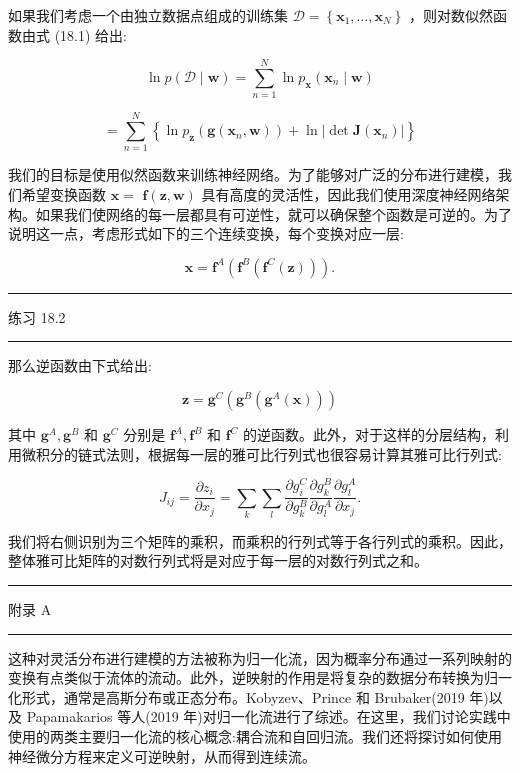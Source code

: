 \documentclass[10pt]{report}
\newcommand{\HRule}{\begin{center}\rule{0.9\linewidth}{0.2mm}\end{center}}
\begin{document}
如果我们考虑一个由独立数据点组成的训练集 \(\mathcal{D} = \left\{  {{\mathbf{x}}_{1},\ldots ,{\mathbf{x}}_{N}}\right\}\) ，则对数似然函数由式 (18.1) 给出:

\[
\ln p\left( {\mathcal{D} \mid  \mathbf{w}}\right)  = \mathop{\sum }\limits_{{n = 1}}^{N}\ln {p}_{\mathbf{x}}\left( {{\mathbf{x}}_{n} \mid  \mathbf{w}}\right)  \tag{18.3}
\]

\[
= \mathop{\sum }\limits_{{n = 1}}^{N}\left\{  {\ln {p}_{\mathbf{z}}\left( {\mathbf{g}\left( {{\mathbf{x}}_{n},\mathbf{w}}\right) }\right)  + \ln \left| {\det \mathbf{J}\left( {\mathbf{x}}_{n}\right) }\right| }\right\}   \tag{18.4}
\]

我们的目标是使用似然函数来训练神经网络。为了能够对广泛的分布进行建模，我们希望变换函数 \(\mathbf{x} =\)  \(\mathbf{f}\left( {\mathbf{z},\mathbf{w}}\right)\) 具有高度的灵活性，因此我们使用深度神经网络架构。如果我们使网络的每一层都具有可逆性，就可以确保整个函数是可逆的。为了说明这一点，考虑形式如下的三个连续变换，每个变换对应一层:

\[
\mathbf{x} = {\mathbf{f}}^{A}\left( {{\mathbf{f}}^{B}\left( {{\mathbf{f}}^{C}\left( \mathbf{z}\right) }\right) }\right) . \tag{18.5}
\]

\HRule

练习 18.2

\HRule

那么逆函数由下式给出:

\[
\mathbf{z} = {\mathbf{g}}^{C}\left( {{\mathbf{g}}^{B}\left( {{\mathbf{g}}^{A}\left( \mathbf{x}\right) }\right) }\right)  \tag{18.6}
\]

其中 \({\mathbf{g}}^{A},{\mathbf{g}}^{B}\) 和 \({\mathbf{g}}^{C}\) 分别是 \({\mathbf{f}}^{A},{\mathbf{f}}^{B}\) 和 \({\mathbf{f}}^{C}\) 的逆函数。此外，对于这样的分层结构，利用微积分的链式法则，根据每一层的雅可比行列式也很容易计算其雅可比行列式:

\[
{J}_{ij} = \frac{\partial {z}_{i}}{\partial {x}_{j}} = \mathop{\sum }\limits_{k}\mathop{\sum }\limits_{l}\frac{\partial {g}_{i}^{C}}{\partial {g}_{k}^{B}}\frac{\partial {g}_{k}^{B}}{\partial {g}_{l}^{A}}\frac{\partial {g}_{l}^{A}}{\partial {x}_{j}}. \tag{18.7}
\]

我们将右侧识别为三个矩阵的乘积，而乘积的行列式等于各行列式的乘积。因此，整体雅可比矩阵的对数行列式将是对应于每一层的对数行列式之和。

\HRule

附录 A

\HRule

这种对灵活分布进行建模的方法被称为归一化流，因为概率分布通过一系列映射的变换有点类似于流体的流动。此外，逆映射的作用是将复杂的数据分布转换为归一化形式，通常是高斯分布或正态分布。Kobyzev、Prince 和 Brubaker(2019 年)以及 Papamakarios 等人(2019 年)对归一化流进行了综述。在这里，我们讨论实践中使用的两类主要归一化流的核心概念:耦合流和自回归流。我们还将探讨如何使用神经微分方程来定义可逆映射，从而得到连续流。
\end{document}
